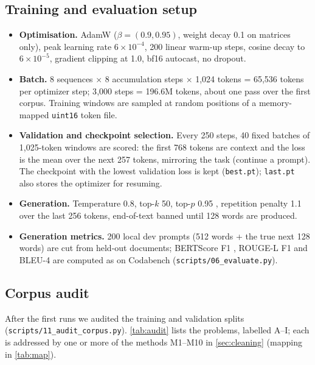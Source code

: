 \documentclass[11pt,a4paper]{article}
\newcommand{\code}[1]{\texttt{\small #1}}
\begin{document}
\subsection{Training and evaluation setup}\label{sec:setup}
\begin{itemize}
  \item \textbf{Optimisation.} AdamW \cite{loshchilov2019adamw} ($\beta=(0.9,0.95)$, weight decay 0.1 on
  matrices only), peak learning rate $6\times10^{-4}$, 200 linear warm-up steps, cosine decay to
  $6\times10^{-5}$, gradient clipping at 1.0, bf16 autocast, no dropout.
  \item \textbf{Batch.} 8 sequences $\times$ 8 accumulation steps $\times$ 1{,}024 tokens = 65{,}536 tokens per
  optimizer step; 3{,}000 steps = 196.6M tokens, about one pass over the first corpus.  Training windows are
  sampled at random positions of a memory-mapped \code{uint16} token file.
  \item \textbf{Validation and checkpoint selection.} Every 250 steps, 40 fixed batches of 1{,}025-token
  windows are scored: the first 768 tokens are context and the loss is the mean over the next 257 tokens,
  mirroring the task (continue a prompt).  The checkpoint with the lowest validation loss is kept
  (\code{best.pt}); \code{last.pt} also stores the optimizer for resuming.
  \item \textbf{Generation.} Temperature 0.8, top-$k$ 50, top-$p$ 0.95 \cite{holtzman2020curious}, repetition
  penalty 1.1 \cite{keskar2019ctrl} over the last 256 tokens, end-of-text banned until 128 words are produced.
  \item \textbf{Generation metrics.} 200 local dev prompts (512 words + the true next 128 words) are cut from
  held-out documents; BERTScore F1 \cite{zhang2020bertscore}, ROUGE-L F1 \cite{lin2004rouge} and BLEU-4
  \cite{papineni2002bleu} are computed as on Codabench (\code{scripts/06\_evaluate.py}).
\end{itemize}

\subsection{Corpus audit}\label{sec:audit}
After the first runs we audited the training and validation splits (\code{scripts/11\_audit\_corpus.py}).
\autoref{tab:audit} lists the problems, labelled A--I; each is addressed by one or more of the methods M1--M10
in \autoref{sec:cleaning} (mapping in \autoref{tab:map}).
\end{document}
